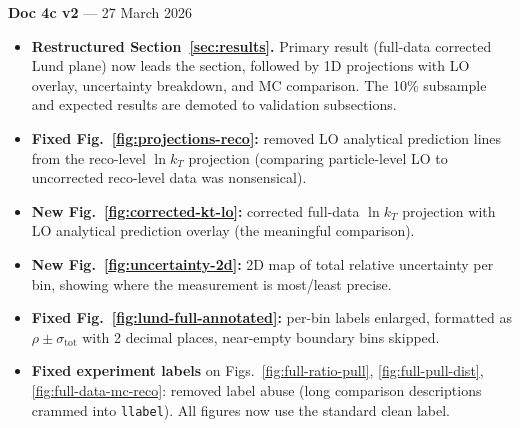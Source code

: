 \documentclass[11pt,a4paper]{article}
\begin{document}
\textbf{Doc 4c v2} --- 27 March 2026
\begin{itemize}
\item \textbf{Restructured Section~\ref{sec:results}.}  Primary result (full-data corrected Lund plane) now leads the section, followed by 1D projections with LO overlay, uncertainty breakdown, and MC comparison.  The 10\% subsample and expected results are demoted to validation subsections.
\item \textbf{Fixed Fig.~\ref{fig:projections-reco}:} removed LO analytical prediction lines from the reco-level $\ln k_T$ projection (comparing particle-level LO to uncorrected reco-level data was nonsensical).
\item \textbf{New Fig.~\ref{fig:corrected-kt-lo}:} corrected full-data $\ln k_T$ projection with LO analytical prediction overlay (the meaningful comparison).
\item \textbf{New Fig.~\ref{fig:uncertainty-2d}:} 2D map of total relative uncertainty per bin, showing where the measurement is most/least precise.
\item \textbf{Fixed Fig.~\ref{fig:lund-full-annotated}:} per-bin labels enlarged, formatted as $\rho \pm \sigma_\text{tot}$ with 2 decimal places, near-empty boundary bins skipped.
\item \textbf{Fixed experiment labels} on Figs.~\ref{fig:full-ratio-pull}, \ref{fig:full-pull-dist}, \ref{fig:full-data-mc-reco}: removed label abuse (long comparison descriptions crammed into \texttt{llabel}).  All figures now use the standard clean label.
\end{itemize}

\medskip
\end{document}
